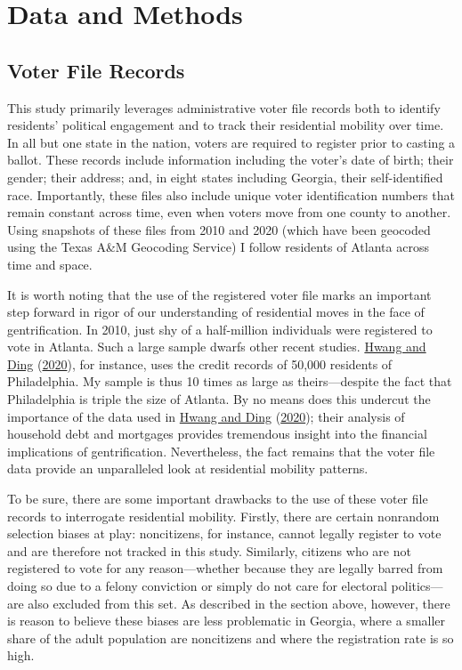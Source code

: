 \documentclass[
  12pt,
]{article}
\begin{document}
\hypertarget{data-and-methods}{%
\section{Data and Methods}\label{data-and-methods}}

\hypertarget{voter-file-records}{%
\subsection{Voter File Records}\label{voter-file-records}}

This study primarily leverages administrative voter file records both to identify residents' political engagement and to track their residential mobility over time. In all but one state in the nation, voters are required to register prior to casting a ballot. These records include information including the voter's date of birth; their gender; their address; and, in eight states including Georgia, their self-identified race. Importantly, these files also include unique voter identification numbers that remain constant across time, even when voters move from one county to another. Using snapshots of these files from 2010 and 2020 (which have been geocoded using the Texas A\&M Geocoding Service) I follow residents of Atlanta across time and space.

It is worth noting that the use of the registered voter file marks an important step forward in rigor of our understanding of residential moves in the face of gentrification. In 2010, just shy of a half-million individuals were registered to vote in Atlanta. Such a large sample dwarfs other recent studies. \protect\hyperlink{ref-Hwang2020}{Hwang and Ding} (\protect\hyperlink{ref-Hwang2020}{2020}), for instance, uses the credit records of 50,000 residents of Philadelphia. My sample is thus 10 times as large as theirs---despite the fact that Philadelphia is triple the size of Atlanta. By no means does this undercut the importance of the data used in \protect\hyperlink{ref-Hwang2020}{Hwang and Ding} (\protect\hyperlink{ref-Hwang2020}{2020}); their analysis of household debt and mortgages provides tremendous insight into the financial implications of gentrification. Nevertheless, the fact remains that the voter file data provide an unparalleled look at residential mobility patterns.

To be sure, there are some important drawbacks to the use of these voter file records to interrogate residential mobility. Firstly, there are certain nonrandom selection biases at play: noncitizens, for instance, cannot legally register to vote and are therefore not tracked in this study. Similarly, citizens who are not registered to vote for any reason---whether because they are legally barred from doing so due to a felony conviction or simply do not care for electoral politics---are also excluded from this set. As described in the section above, however, there is reason to believe these biases are less problematic in Georgia, where a smaller share of the adult population are noncitizens and where the registration rate is so high.
\end{document}
